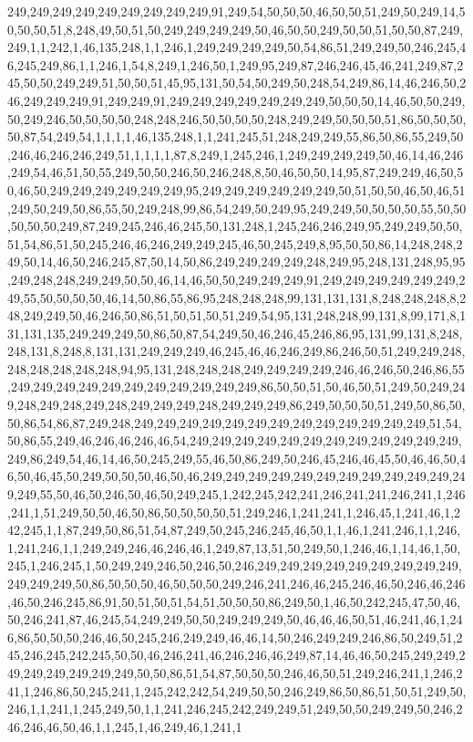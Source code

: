 249,249,249,249,249,249,249,249,249,91,249,54,50,50,50,46,50,50,51,249,50,249,14,50,50,50,51,8,248,49,50,51,50,249,249,249,249,50,46,50,50,249,50,50,51,50,50,87,249,249,1,1,242,1,46,135,248,1,1,246,1,249,249,249,249,50,54,86,51,249,249,50,246,245,46,245,249,86,1,1,246,1,54,8,249,1,246,50,1,249,95,249,87,246,246,45,46,241,249,87,245,50,50,249,249,51,50,50,51,45,95,131,50,54,50,249,50,248,54,249,86,14,46,246,50,246,249,249,249,91,249,249,91,249,249,249,249,249,249,249,50,50,50,14,46,50,50,249,50,249,246,50,50,50,50,248,248,246,50,50,50,50,248,249,249,50,50,50,51,86,50,50,50,50,87,54,249,54,1,1,1,1,46,135,248,1,1,241,245,51,248,249,249,55,86,50,86,55,249,50,246,46,246,246,249,51,1,1,1,1,87,8,249,1,245,246,1,249,249,249,249,50,46,14,46,246,249,54,46,51,50,55,249,50,50,246,50,246,248,8,50,46,50,50,14,95,87,249,249,46,50,50,46,50,249,249,249,249,249,249,95,249,249,249,249,249,249,50,51,50,50,46,50,46,51,249,50,249,50,86,55,50,249,248,99,86,54,249,50,249,95,249,249,50,50,50,50,55,50,50,50,50,50,249,87,249,245,246,46,245,50,131,248,1,245,246,246,249,95,249,249,50,50,51,54,86,51,50,245,246,46,246,249,249,245,46,50,245,249,8,95,50,50,86,14,248,248,249,50,14,46,50,246,245,87,50,14,50,86,249,249,249,249,248,249,95,248,131,248,95,95,249,248,248,249,249,50,50,46,14,46,50,50,249,249,249,91,249,249,249,249,249,249,249,55,50,50,50,50,46,14,50,86,55,86,95,248,248,248,99,131,131,131,8,248,248,248,8,248,249,249,50,46,246,50,86,51,50,51,50,51,249,54,95,131,248,248,99,131,8,99,171,8,131,131,135,249,249,249,50,86,50,87,54,249,50,46,246,45,246,86,95,131,99,131,8,248,248,131,8,248,8,131,131,249,249,249,46,245,46,46,246,249,86,246,50,51,249,249,248,248,248,248,248,248,94,95,131,248,248,248,249,249,249,249,246,46,246,50,246,86,55,249,249,249,249,249,249,249,249,249,249,249,86,50,50,51,50,46,50,51,249,50,249,249,248,249,248,249,248,249,249,249,248,249,249,249,86,249,50,50,50,51,249,50,86,50,50,86,54,86,87,249,248,249,249,249,249,249,249,249,249,249,249,249,249,249,51,54,50,86,55,249,46,246,46,246,46,54,249,249,249,249,249,249,249,249,249,249,249,249,249,86,249,54,46,14,46,50,245,249,55,46,50,86,249,50,246,45,246,46,45,50,46,46,50,46,50,46,45,50,249,50,50,50,46,50,46,249,249,249,249,249,249,249,249,249,249,249,249,249,55,50,46,50,246,50,46,50,249,245,1,242,245,242,241,246,241,241,246,241,1,246,241,1,51,249,50,50,46,50,86,50,50,50,50,51,249,246,1,241,241,1,246,45,1,241,46,1,242,245,1,1,87,249,50,86,51,54,87,249,50,245,246,245,46,50,1,1,46,1,241,246,1,1,246,1,241,246,1,1,249,249,246,46,246,46,1,249,87,13,51,50,249,50,1,246,46,1,14,46,1,50,245,1,246,245,1,50,249,249,246,50,246,50,246,249,249,249,249,249,249,249,249,249,249,249,249,50,86,50,50,50,46,50,50,50,249,246,241,246,46,245,246,46,50,246,46,246,46,50,246,245,86,91,50,51,50,51,54,51,50,50,50,86,249,50,1,46,50,242,245,47,50,46,50,246,241,87,46,245,54,249,249,50,50,249,249,249,50,46,46,46,50,51,46,241,46,1,246,86,50,50,50,246,46,50,245,246,249,249,46,46,14,50,246,249,249,246,86,50,249,51,245,246,245,242,245,50,50,46,246,241,46,246,246,46,249,87,14,46,46,50,245,249,249,249,249,249,249,249,249,50,50,86,51,54,87,50,50,50,246,46,50,51,249,246,241,1,246,241,1,246,86,50,245,241,1,245,242,242,54,249,50,50,246,249,86,50,86,51,50,51,249,50,246,1,1,241,1,245,249,50,1,1,241,246,245,242,249,249,51,249,50,50,249,249,50,246,246,246,46,50,46,1,1,245,1,46,249,46,1,241,1
